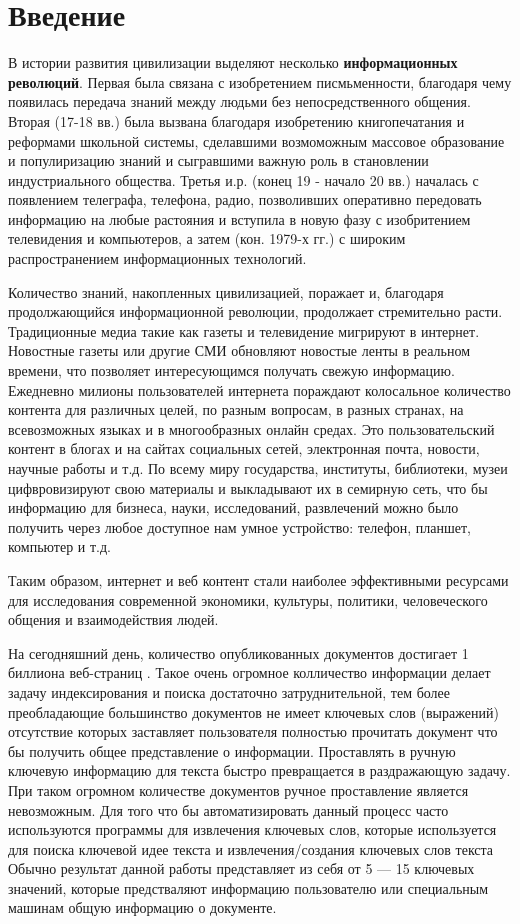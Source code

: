 \section{Введение}
В истории развития цивилизации выделяют несколько \textbf{информационных революций}.
Первая была связана с изобретением писмьменности, благодаря чему появилась передача знаний между людьми без непосредственного общения.
Вторая (17-18 вв.) была вызвана благодаря изобретению книгопечатания и реформами школьной системы, сделавшими возмоможным массовое образование и популиризацию знаний и сыгравшими важную роль в становлении индустриального общества.
Третья и.р. (конец 19 - начало 20 вв.) началась с появлением телеграфа, телефона, радио, позволивших оперативно передовать информацию на любые растояния и вступила в новую фазу с изобритением телевидения и компьютеров, а затем (кон. 1979-х гг.) с широким распространением информационных технологий. \cite{16}

Количество знаний, накопленных цивилизацией, поражает и, благодаря продолжающийся информационной революции, продолжает стремительно расти.
Традиционные медиа такие как газеты и телевидение мигрируют в интернет.
Новостные газеты или другие СМИ обновляют новостые ленты в реальном времени, что позволяет интересующимся получать свежую информацию.
Ежедневно милионы пользователей интернета пораждают колосальное количество контента для различных целей, по разным вопросам, в разных странах, на всевозможных языках и в многообразных онлайн средах.
Это пользовательский контент в блогах и на сайтах социальных сетей, электронная почта, новости, научные работы и т.д.
По всему миру государства, институты, библиотеки, музеи цифвровизируют свою материалы и выкладывают их в семирную сеть, что бы информацию для бизнеса, науки, исследований, развлечений можно было получить через любое доступное нам умное устройство: телефон, планшет, компьютер и т.д. \cite{2}

Таким образом, интернет и веб контент стали наиболее эффективными ресурсами для исследования современной экономики, культуры, политики, человеческого общения и взаимодействия людей. \cite{2}

На сегодняшний день, количество опубликованных документов достигает 1 биллиона веб-страниц \cite{1}. 
Такое очень огромное колличество информации делает задачу индексирования и поиска достаточно затруднительной, тем более преобладающие большинство документов не имеет ключевых слов (выражений) отсутствие которых заставляет пользователя полностью прочитать документ что бы получить общее представление о информации.
Проставлять в ручную ключевую информацию для текста быстро превращается в раздражающую задачу. 
При таком огромном количестве документов ручное проставление является невозможным. 
Для того что бы автоматизировать данный процесс часто используются программы для извлечения ключевых слов, которые используется для поиска ключевой идее текста и извлечения/создания ключевых слов текста
Обычно результат данной работы представляет из себя от 5 — 15 ключевых значений, которые предстваляют информацию пользователю или специальным машинам общую информацию о документе.

